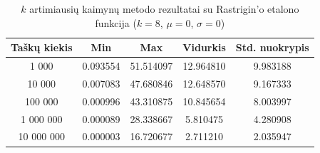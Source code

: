 \begin{table}[H]
    \centering
    \begin{tabular}{|c|c|c|c|c|}
        \hline
        \textbf{Taškų kiekis} & \textbf{Min} & \textbf{Max} & \textbf{Vidurkis} & \textbf{Std. nuokrypis} \\ \hline
        1 000        & 0.093554 & 51.514097 & 12.964810 & 9.983188 \\ \hline
        10 000       & 0.007083 & 47.680846 & 12.648570 & 9.167333 \\ \hline
        100 000      & 0.000996 & 43.310875 & 10.845654 & 8.003997 \\ \hline
        1 000 000    & 0.000089 & 28.338667 & 5.810475 & 4.280908 \\ \hline
        10 000 000   & 0.000003 & 16.720677 & 2.711210 & 2.035947 \\ \hline
    \end{tabular}
    \caption{$k$ artimiausių kaimynų metodo rezultatai su Rastrigin'o etalono funkcija ($k = 8$, $\mu = 0$, $\sigma = 0$)}
\end{table}